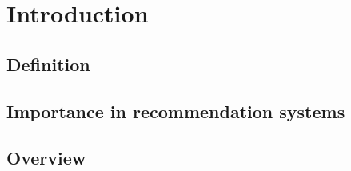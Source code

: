 \section{Introduction}\label{sec:introduction}

\subsection{Definition}%

\subsection{Importance in recommendation systems} %

\subsection{Overview} %